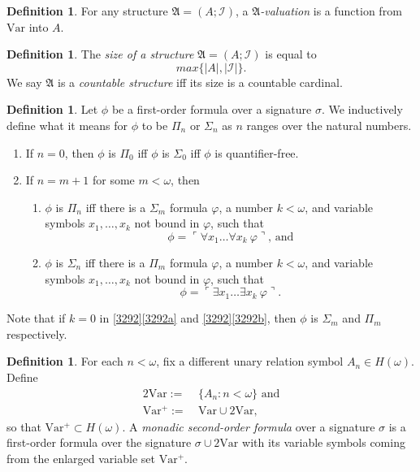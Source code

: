 \documentclass[12pt, twoside]{memoir}
\numberwithin{equation}{section}
\theoremstyle{definition}
\newtheorem{defi}[thm]{Definition}
\theoremstyle{remark}
\theoremstyle{definition}
\theoremstyle{definition}
\theoremstyle{definition}
\theoremstyle{remark}
\begin{document}
\begin{defi}
For any structure $\mathfrak{A} = (A; \mathcal{I})$, a $\mathfrak{A}$\emph{-valuation} is a function from $\mathrm{Var}$ into $A$.
\end{defi}

\begin{defi}
The \emph{size of a structure} $\mathfrak{A} = (A; \mathcal{I})$ is equal to $$max\{|A|, |\mathcal{I}|\}.$$ We say $\mathfrak{A}$ is a \emph{countable structure} iff its size is a countable cardinal.
\end{defi}

\begin{defi}\label{def25}
Let $\phi$ be a first-order formula over a signature $\sigma$. We inductively define what it means for $\phi$ to be $\Pi_n$ or $\Sigma_n$ as $n$ ranges over the natural numbers.
\begin{enumerate}[label=(\arabic*)]
    \item If $n = 0$, then $\phi$ is $\Pi_0$ iff $\phi$ is $\Sigma_0$ iff $\phi$ is quantifier-free.
    \item\label{3292} If $n = m + 1$ for some $m < \omega$, then 
    \begin{enumerate}[label=(\alph*)]
        \item\label{3292a} $\phi$ is $\Pi_n$ iff there is a $\Sigma_m$ formula $\varphi$, a number $k < \omega$, and variable symbols $x_1, \dots, x_k$ not bound in $\varphi$, such that 
        \begin{equation*}
            \phi = \ulcorner \forall x_1 \dots \forall x_k \ \varphi \urcorner \text{, and}
        \end{equation*}
        \item\label{3292b} $\phi$ is $\Sigma_n$ iff there is a $\Pi_m$ formula $\varphi$, a number $k < \omega$, and variable symbols $x_1, \dots, x_k$ not bound in $\varphi$, such that 
        \begin{equation*}
            \phi = \ulcorner \exists x_1 \dots \exists x_k \ \varphi \urcorner \text{.}
        \end{equation*}
    \end{enumerate}
\end{enumerate}
Note that if $k = 0$ in \ref{3292}\ref{3292a} and \ref{3292}\ref{3292b}, then $\phi$ is $\Sigma_m$ and $\Pi_m$ respectively.
\end{defi}

\begin{defi}
For each $n < \omega$, fix a different unary relation symbol $A_n \in H(\omega)$. Define
\begin{align*}
    \mathrm{2Var} := \ & \{A_n : n < \omega\}  \text{ and} \\
    \mathrm{Var^+} := \ & \mathrm{Var} \cup \mathrm{2Var} \text{,}
\end{align*}
so that $\mathrm{Var^+} \subset H(\omega)$. A \emph{monadic second-order formula} over a signature $\sigma$ is a first-order formula over the signature $\sigma \cup \mathrm{2Var}$ with its variable symbols coming from the enlarged variable set $\mathrm{Var^+}$. 
\end{defi}
\end{document}

